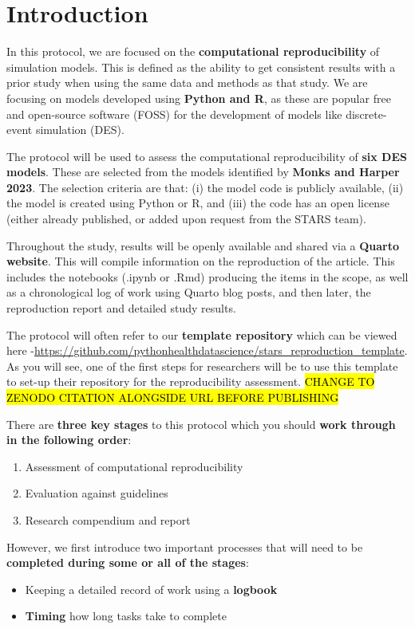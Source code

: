 \section{Introduction}

In this protocol, we are focused on the \textbf{computational reproducibility} of simulation models. This is defined as the ability to get consistent results with a prior study when using  the same data and methods as that study. We are focusing on models developed using \textbf{Python and R}, as these are popular free and open-source software (FOSS) for the development of models like discrete-event simulation (DES).\autocite{monks_computer_2023}

The protocol will be used to assess the computational reproducibility of \textbf{six DES models}. These are selected from the models identified by \textbf{Monks and Harper 2023}.\autocite{monks_computer_2023} The selection criteria are that: (i) the model code is publicly available, (ii) the model is created using Python or R, and (iii) the code has an open license (either already published, or added upon request from the STARS team).

Throughout the study, results will be openly available and shared via a \textbf{Quarto website}. This will compile information on the reproduction of the article. This includes the notebooks (.ipynb or .Rmd) producing the items in the scope, as well as a chronological log of work using Quarto blog posts, and then later, the reproduction report and detailed study results.

The protocol will often refer to our \textbf{template repository} which can be viewed here -\url{https://github.com/pythonhealthdatascience/stars_reproduction_template}. As you will see, one of the first steps for researchers will be to use this template to set-up their repository for the reproducibility assessment. \hl{CHANGE TO ZENODO CITATION ALONGSIDE URL BEFORE PUBLISHING}

There are \textbf{three key stages} to this protocol which you should \textbf{work through in the following order}:
\begin{enumerate}
    \item Assessment of computational reproducibility
    \item Evaluation against guidelines
    \item Research compendium and report
\end{enumerate}

However, we first introduce two important processes that will need to be \textbf{completed during some or all of the stages}:
\begin{itemize}
    \item Keeping a detailed record of work using a \textbf{logbook}
    \item \textbf{Timing} how long tasks take to complete
\end{itemize}

